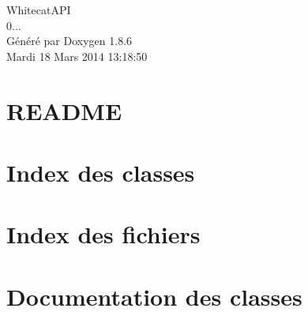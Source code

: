 \documentclass[twoside]{book}
\newcommand{\clearemptydoublepage}{%
  \newpage{\pagestyle{empty}\cleardoublepage}%
}
\begin{document}
\hypersetup{pageanchor=false}
\begin{titlepage}
\vspace*{7cm}
\begin{center}%
{\Large Whitecat\-A\-P\-I \\[1ex]\large 0... }\\
\vspace*{1cm}
{\large Généré par Doxygen 1.8.6}\\
\vspace*{0.5cm}
{\small Mardi 18 Mars 2014 13:18:50}\\
\end{center}
\end{titlepage}
\clearemptydoublepage
\tableofcontents
\clearemptydoublepage
{}
\hypersetup{pageanchor=true}

\chapter{R\-E\-A\-D\-M\-E}
\label{md__r_e_a_d_m_e}
\hypertarget{md__r_e_a_d_m_e}{}

\chapter{Index des classes}

\chapter{Index des fichiers}

\chapter{Documentation des classes}





\end{document}

